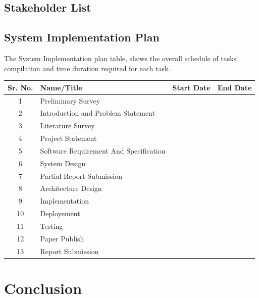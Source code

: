\documentclass[oneside,a4paper,12pt]{report}
\begin{document}
\section{Stakeholder List}




\section{System Implementation Plan}

The System Implementation plan table, shows the overall schedule of tasks compilation and
time duration required for each task.

\begin{center}

\begin{tabular}{|c|p{6cm}|p{3cm}|p{3cm}|}
\hline
\textbf{Sr. No.} & \textbf{Name/Title} & \textbf{Start Date}& \textbf{End Date} \\

\hline
1& Preliminary Survey& &  \\
\hline
2& Introduction and Problem Statement
&  &  \\
\hline
3& Literature Survey&      &   \\
\hline
4& Project Statement
&  & \\
\hline
5& Software Requirement And Specification &    & \\
\hline
6 & System Design &  & \\
\hline
7 & Partial Report Submission &  &     \\
\hline
8 & Architecture Design &      &    \\
\hline
9 & Implementation
 &    & \\
\hline
10 & Deployement &      &   \\
\hline
11 & Testing &  &  \\
\hline
12 & Paper Publish
 &  & \\
\hline
13 & Report Submission
 &  &  \\
\hline

\end{tabular}  
\end{center}





 \chapter{Conclusion}
\end{document}
